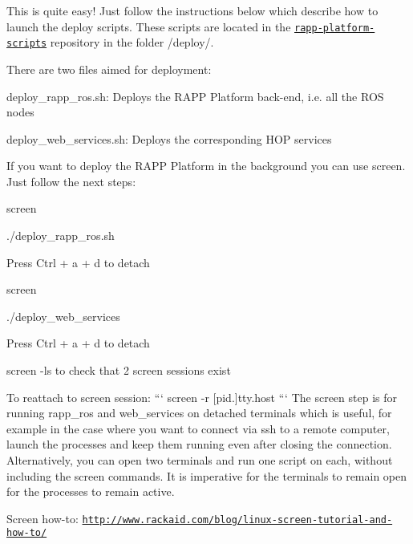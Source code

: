 This is quite easy! Just follow the instructions below which describe how to launch the deploy scripts. These scripts are located in the \href{https://github.com/rapp-project/rapp-platform-scripts}{\tt rapp-\/platform-\/scripts} repository in the folder {\ttfamily /deploy/}.

There are two files aimed for deployment\-:


\begin{DoxyItemize}
\item {\ttfamily deploy\-\_\-rapp\-\_\-ros.\-sh}\-: Deploys the R\-A\-P\-P Platform back-\/end, i.\-e. all the R\-O\-S nodes
\item {\ttfamily deploy\-\_\-web\-\_\-services.\-sh}\-: Deploys the corresponding H\-O\-P services
\end{DoxyItemize}

If you want to deploy the R\-A\-P\-P Platform in the background you can use {\ttfamily screen}. Just follow the next steps\-:


\begin{DoxyItemize}
\item {\ttfamily screen}
\item {\ttfamily ./deploy\-\_\-rapp\-\_\-ros.sh}
\item Press Ctrl + a + d to detach
\item {\ttfamily screen}
\item {\ttfamily ./deploy\-\_\-web\-\_\-services}
\item Press Ctrl + a + d to detach
\item {\ttfamily screen -\/ls} to check that 2 screen sessions exist
\end{DoxyItemize}

To reattach to screen session\-: ``` screen -\/r \mbox{[}pid.\mbox{]}tty.\-host ``` The screen step is for running rapp\-\_\-ros and web\-\_\-services on detached terminals which is useful, for example in the case where you want to connect via ssh to a remote computer, launch the processes and keep them running even after closing the connection. Alternatively, you can open two terminals and run one script on each, without including the screen commands. It is imperative for the terminals to remain open for the processes to remain active.

Screen how-\/to\-: \href{http://www.rackaid.com/blog/linux-screen-tutorial-and-how-to/}{\tt http\-://www.\-rackaid.\-com/blog/linux-\/screen-\/tutorial-\/and-\/how-\/to/} 